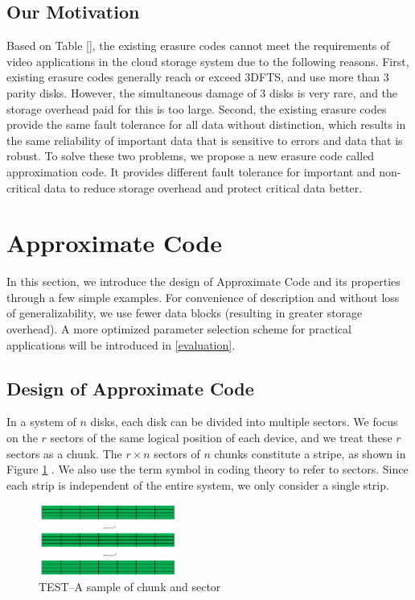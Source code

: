 \documentclass[sigconf]{acmart}
\begin{document}
\subsection{Our Motivation}
Based on Table [], the existing erasure codes cannot meet the requirements of video applications in the cloud storage system due to the following reasons. First, existing erasure codes generally reach or exceed 3DFTS, and use more than 3 parity disks. However, the simultaneous damage of 3 disks is very rare, and the storage overhead paid for this is too large. Second, the existing erasure codes provide the same fault tolerance for all data without distinction, which results in the same reliability of important data that is sensitive to errors and data that is robust. To solve these two problems, we propose a new erasure code called approximation code. It provides different fault tolerance for important and non-critical data to reduce storage overhead and protect critical data better.

\section{Approximate Code}
In this section, we introduce the design of Approximate Code and its properties through a few simple examples. For convenience of description and without loss of generalizability, we use fewer data blocks (resulting in greater storage overhead). A more optimized parameter selection scheme for practical applications will be introduced in \ref{evaluation}.

\subsection{Design of Approximate Code}
In a system of $n$ disks, each disk can be divided into multiple sectors. We focus on the $r$ sectors of the same logical position of each device, and we treat these $r$ sectors as a chunk. The $r \times n$ sectors of $n$ chunks constitute a stripe, as shown in Figure \ref{TEST-chunk-sector} . We also use the term symbol in coding theory to refer to sectors. Since each strip is independent of the entire system, we only consider a single strip.

\begin{figure}[ht]
\centering
\includegraphics[width=0.4\textwidth]{photo/TEST-chunk-sector.JPG}
\caption{TEST--A sample of chunk and sector}
\label{TEST-chunk-sector}
\end{figure}
\end{document}

